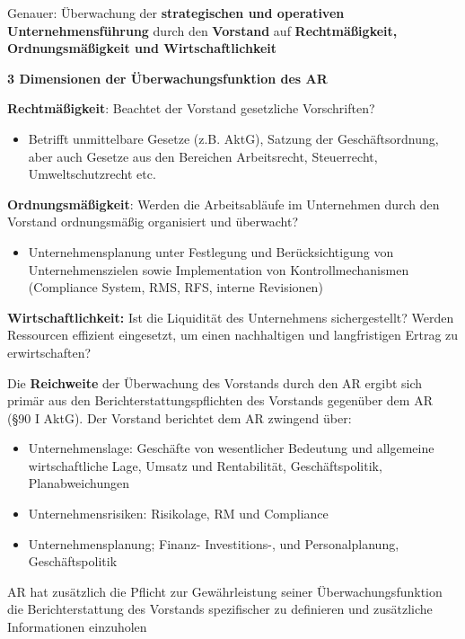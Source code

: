 \documentclass[
]{article}
\providecommand{\tightlist}{%
  \setlength{\itemsep}{0pt}\setlength{\parskip}{0pt}}
\begin{document}
Genauer: Überwachung der \textbf{strategischen und operativen
Unternehmensführung} durch den \textbf{Vorstand} auf
\textbf{Rechtmäßigkeit, Ordnungsmäßigkeit und Wirtschaftlichkeit}

\textbf{3 Dimensionen der Überwachungsfunktion des AR}

\textbf{Rechtmäßigkeit}: Beachtet der Vorstand gesetzliche Vorschriften?

\begin{itemize}
\tightlist
\item
  Betrifft unmittelbare Gesetze (z.B. AktG), Satzung der
  Geschäftsordnung, aber auch Gesetze aus den Bereichen Arbeitsrecht,
  Steuerrecht, Umweltschutzrecht etc.
\end{itemize}

\textbf{Ordnungsmäßigkeit}: Werden die Arbeitsabläufe im Unternehmen
durch den Vorstand ordnungsmäßig organisiert und überwacht?

\begin{itemize}
\tightlist
\item
  Unternehmensplanung unter Festlegung und Berücksichtigung von
  Unternehmenszielen sowie Implementation von Kontrollmechanismen
  (Compliance System, RMS, RFS, interne Revisionen)
\end{itemize}

\textbf{Wirtschaftlichkeit: }Ist die Liquidität des Unternehmens
sichergestellt? Werden Ressourcen effizient eingesetzt, um einen
nachhaltigen und langfristigen Ertrag zu erwirtschaften?

Die \textbf{Reichweite} der Überwachung des Vorstands durch den AR
ergibt sich primär aus den Berichterstattungspflichten des Vorstands
gegenüber dem AR (§90 I AktG). Der Vorstand berichtet dem AR zwingend
über:

\begin{itemize}
\tightlist
\item
  Unternehmenslage: Geschäfte von wesentlicher Bedeutung und allgemeine
  wirtschaftliche Lage, Umsatz und Rentabilität, Geschäftspolitik,
  Planabweichungen
\item
  Unternehmensrisiken: Risikolage, RM und Compliance
\item
  Unternehmensplanung; Finanz- Investitions-, und Personalplanung,
  Geschäftspolitik
\end{itemize}

AR hat zusätzlich die Pflicht zur Gewährleistung seiner
Überwachungsfunktion die Berichterstattung des Vorstands spezifischer zu
definieren und zusätzliche Informationen einzuholen
\end{document}
